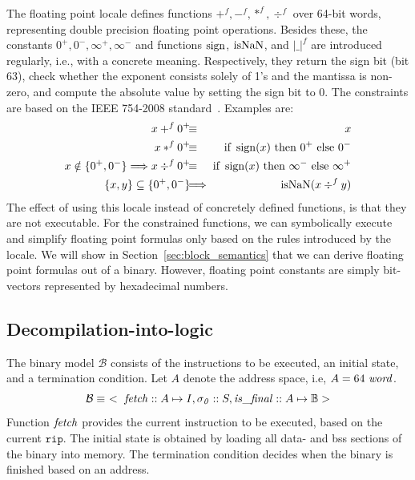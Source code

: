 The floating point locale defines functions $+^f, -^f, *^f, \div^f$ over 64-bit words, representing double precision floating point operations.
Besides these, the constants $0^+, 0^-, \infty^+, \infty^-$ and functions $\operatorname{sign}$, $\operatorname{isNaN}$, and $|\_|^f$ are introduced regularly, i.e., with a concrete meaning.
Respectively, they return the sign bit (bit 63), check whether the exponent consists solely of 1's and the mantissa is non-zero, and compute the absolute value by setting the sign bit to 0.
The constraints are based on the IEEE 754-2008 standard~\cite{4610935}.
Examples are:
\begin{eqnarray*}
x +^f 0^+ \hspace{-1ex}&\equiv& \hspace{-1ex} x \\
x *^f 0^+ \hspace{-1ex}&\equiv& \hspace{-1ex}\mbox{if~} \sign(x) \mbox{~then~} 0^+ \mbox{~else~} 0^-\\
x \notin \{0^+,0^-\} \Longrightarrow x \div^f 0^+ \hspace{-1ex}&\equiv&\hspace{-1ex} \mbox{if~} \sign(x) \mbox{~then~} \infty^- \mbox{~else~} \infty^+\\
\{x, y\} \subseteq \{0^+,0^-\} \hspace{-1ex}&\Longrightarrow&\hspace{-1ex} \isNaN(x \div^f y)
\end{eqnarray*}
The effect of using this locale instead of concretely defined functions, is that they are not executable.
For the constrained functions, we can symbolically execute and simplify floating point formulas only based on the rules introduced by the locale.
We will show in Section~\ref{sec:block_semantics} that we can derive floating point formulas out of a binary.
However, floating point constants are simply bit-vectors represented by hexadecimal numbers.

\subsection{Decompilation-into-logic}\label{sec:binary_model_overview}

The binary model $\mathcal{B}$ consists of the instructions to be executed, an initial state, and a termination condition.
Let $A$ denote the address space, i.e, $A = 64~\mathit{word}$.
\[
	\mathcal{B} \equiv~<~\mathit{fetch} :: A \mapsto I, \mathit{\sigma_0} :: S, \mathit{is\_final} :: A \mapsto \mathbb{B}>
\]
Function $\mathit{fetch}$ provides the current instruction to be executed, based on the current $\mathtt{rip}$.
The initial state is obtained by loading all data- and bss sections of the binary into memory.
The termination condition decides when the binary is finished based on an address.

